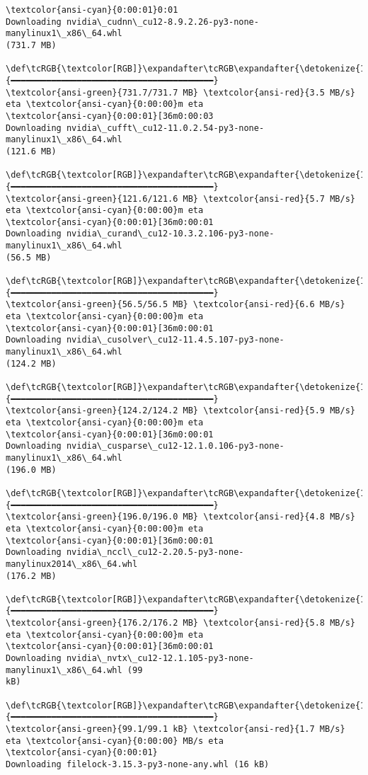 \documentclass[11pt]{article}
\begin{document}
\begin{Verbatim}[commandchars=\\\{\}]
\textcolor{ansi-cyan}{0:00:01}0:01
Downloading nvidia\_cudnn\_cu12-8.9.2.26-py3-none-manylinux1\_x86\_64.whl
(731.7 MB)
   \def\tcRGB{\textcolor[RGB]}\expandafter\tcRGB\expandafter{\detokenize{114,156,31}}{━━━━━━━━━━━━━━━━━━━━━━━━━━━━━━━━━━━━━━━━}
\textcolor{ansi-green}{731.7/731.7 MB} \textcolor{ansi-red}{3.5 MB/s} eta \textcolor{ansi-cyan}{0:00:00}m eta
\textcolor{ansi-cyan}{0:00:01}[36m0:00:03
Downloading nvidia\_cufft\_cu12-11.0.2.54-py3-none-manylinux1\_x86\_64.whl
(121.6 MB)
   \def\tcRGB{\textcolor[RGB]}\expandafter\tcRGB\expandafter{\detokenize{114,156,31}}{━━━━━━━━━━━━━━━━━━━━━━━━━━━━━━━━━━━━━━━━}
\textcolor{ansi-green}{121.6/121.6 MB} \textcolor{ansi-red}{5.7 MB/s} eta \textcolor{ansi-cyan}{0:00:00}m eta
\textcolor{ansi-cyan}{0:00:01}[36m0:00:01
Downloading nvidia\_curand\_cu12-10.3.2.106-py3-none-manylinux1\_x86\_64.whl
(56.5 MB)
   \def\tcRGB{\textcolor[RGB]}\expandafter\tcRGB\expandafter{\detokenize{114,156,31}}{━━━━━━━━━━━━━━━━━━━━━━━━━━━━━━━━━━━━━━━━}
\textcolor{ansi-green}{56.5/56.5 MB} \textcolor{ansi-red}{6.6 MB/s} eta \textcolor{ansi-cyan}{0:00:00}m eta
\textcolor{ansi-cyan}{0:00:01}[36m0:00:01
Downloading nvidia\_cusolver\_cu12-11.4.5.107-py3-none-manylinux1\_x86\_64.whl
(124.2 MB)
   \def\tcRGB{\textcolor[RGB]}\expandafter\tcRGB\expandafter{\detokenize{114,156,31}}{━━━━━━━━━━━━━━━━━━━━━━━━━━━━━━━━━━━━━━━━}
\textcolor{ansi-green}{124.2/124.2 MB} \textcolor{ansi-red}{5.9 MB/s} eta \textcolor{ansi-cyan}{0:00:00}m eta
\textcolor{ansi-cyan}{0:00:01}[36m0:00:01
Downloading nvidia\_cusparse\_cu12-12.1.0.106-py3-none-manylinux1\_x86\_64.whl
(196.0 MB)
   \def\tcRGB{\textcolor[RGB]}\expandafter\tcRGB\expandafter{\detokenize{114,156,31}}{━━━━━━━━━━━━━━━━━━━━━━━━━━━━━━━━━━━━━━━━}
\textcolor{ansi-green}{196.0/196.0 MB} \textcolor{ansi-red}{4.8 MB/s} eta \textcolor{ansi-cyan}{0:00:00}m eta
\textcolor{ansi-cyan}{0:00:01}[36m0:00:01
Downloading nvidia\_nccl\_cu12-2.20.5-py3-none-manylinux2014\_x86\_64.whl
(176.2 MB)
   \def\tcRGB{\textcolor[RGB]}\expandafter\tcRGB\expandafter{\detokenize{114,156,31}}{━━━━━━━━━━━━━━━━━━━━━━━━━━━━━━━━━━━━━━━━}
\textcolor{ansi-green}{176.2/176.2 MB} \textcolor{ansi-red}{5.8 MB/s} eta \textcolor{ansi-cyan}{0:00:00}m eta
\textcolor{ansi-cyan}{0:00:01}[36m0:00:01
Downloading nvidia\_nvtx\_cu12-12.1.105-py3-none-manylinux1\_x86\_64.whl (99
kB)
   \def\tcRGB{\textcolor[RGB]}\expandafter\tcRGB\expandafter{\detokenize{114,156,31}}{━━━━━━━━━━━━━━━━━━━━━━━━━━━━━━━━━━━━━━━━}
\textcolor{ansi-green}{99.1/99.1 kB} \textcolor{ansi-red}{1.7 MB/s} eta \textcolor{ansi-cyan}{0:00:00} MB/s eta
\textcolor{ansi-cyan}{0:00:01}
Downloading filelock-3.15.3-py3-none-any.whl (16 kB)

\end{Verbatim}
\end{document}
